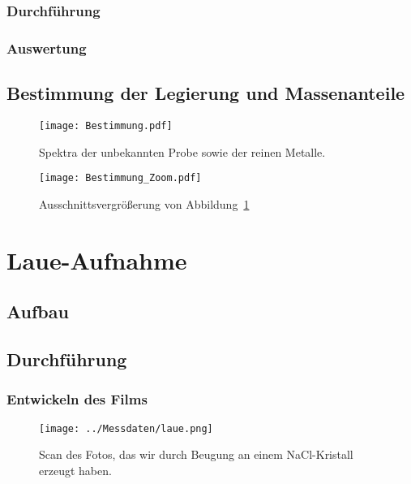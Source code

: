 \subsection{Durchführung}

\subsection{Auswertung}

\section{Bestimmung der Legierung und Massenanteile}

\begin{figure}[htbp]
    \centering
    \texttt{[image: Bestimmung.pdf]}
    \caption{%
        Spektra der unbekannten Probe sowie der reinen Metalle.
    }
    \label{fig:Bestimmung}
\end{figure}

\begin{figure}[htbp]
    \centering
    \texttt{[image: Bestimmung\_Zoom.pdf]}
    \caption{%
        Ausschnittsvergrößerung von Abbildung~\ref{fig:Bestimmung}
    }
    \label{fig:Bestimmung_Zoom}
\end{figure}

\chapter{Laue-Aufnahme}

\section{Aufbau}

\section{Durchführung}

\subsection{Entwickeln des Films}

\begin{figure}[htbp]
    \centering
    \texttt{[image: ../Messdaten/laue.png]}
    \caption{%
        Scan des Fotos, das wir durch Beugung an einem NaCl-Kristall erzeugt
        haben.
    }
    \label{fig:Laue}
\end{figure}

